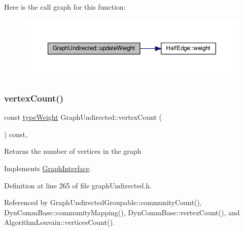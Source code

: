 Here is the call graph for this function\+:
\nopagebreak
\begin{figure}[H]
\begin{center}
\leavevmode
\includegraphics[width=350pt]{classGraphUndirected_aba42cbb7de421af5452f50025154ec73_cgraph}
\end{center}
\end{figure}
\mbox{\label{classGraphUndirected_adf50305970536f71586f8f63462dfcdc}} 
\subsubsection{\texorpdfstring{vertex\+Count()}{vertexCount()}}
{\footnotesize\ttfamily const \hyperlink{edge_8h_a2e7ea3be891ac8b52f749ec73fee6dd2}{type\+Weight} Graph\+Undirected\+::vertex\+Count (\begin{DoxyParamCaption}{ }\end{DoxyParamCaption}) const\hspace{0.3cm}{\ttfamily [inline]}, {\ttfamily [virtual]}}

\begin{DoxyReturn}{Returns}
the number of vertices in the graph 
\end{DoxyReturn}


Implements \hyperlink{classGraphInterface_a483f64f8d37af2b363f2f4eb37943dfd}{Graph\+Interface}.



Definition at line 265 of file graph\+Undirected.\+h.



Referenced by Graph\+Undirected\+Groupable\+::community\+Count(), Dyn\+Comm\+Base\+::community\+Mapping(), Dyn\+Comm\+Base\+::vertex\+Count(), and Algorithm\+Louvain\+::vertices\+Count().

\mbox{\label{classGraphUndirected_ae40d431c92d8b4884c7915c44d42f356}} 
